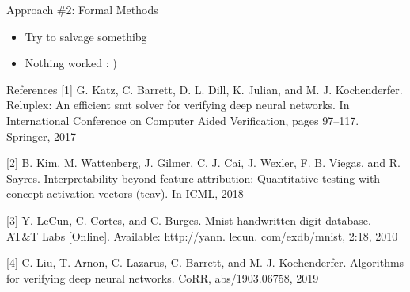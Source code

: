 \documentclass[final]{beamer}
\begin{document}
\begin{frame}[fragile]{}
\begin{textblock}{\colwidth}
\begin{paddedBlock}{Approach \#2: Formal Methods}
\begin{itemize}
  \item Try to salvage somethibg
  \item Nothing worked : )
\end{itemize}

\end{paddedBlock}


\begin{paddedBlock}{References}
\footnotesize{[1] G. Katz, C. Barrett, D. L. Dill, K. Julian, and M. J. Kochenderfer. Reluplex: An efficient smt solver for verifying deep neural networks. In International Conference on Computer Aided Verification, pages 97–117. Springer, 2017}

\footnotesize{[2] B. Kim, M. Wattenberg, J. Gilmer, C. J. Cai, J. Wexler, F. B. Viegas, and R. Sayres. Interpretability beyond feature attribution: Quantitative testing with concept activation vectors (tcav). In ICML, 2018}

\footnotesize{[3] Y. LeCun, C. Cortes, and C. Burges. Mnist handwritten digit database. AT&T Labs [Online]. Available: http://yann. lecun. com/exdb/mnist, 2:18, 2010}

\footnotesize{[4] C. Liu, T. Arnon, C. Lazarus, C. Barrett, and M. J. Kochenderfer. Algorithms for verifying deep neural networks. CoRR, abs/1903.06758, 2019}

\end{paddedBlock}
\end{textblock}






\end{frame}
\end{document}
